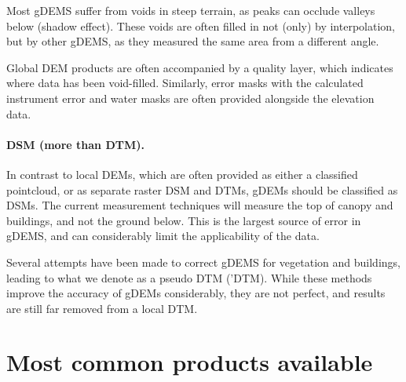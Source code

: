 Most gDEMS suffer from voids in steep terrain, as peaks can occlude valleys below (shadow effect).
These voids are often filled in not (only) by interpolation, but by other gDEMS, as they measured the same area from a different angle.


Global DEM products are often accompanied by a quality layer, which indicates where data has been void-filled.
Similarly, error masks with the calculated instrument error and water masks are often provided alongside the elevation data.





\paragraph{DSM (more than DTM).}
In contrast to local DEMs, which are often provided as either a classified pointcloud, or as separate raster DSM and DTMs, gDEMs should be classified as DSMs.
The current measurement techniques will measure the top of canopy and buildings, and not the ground below.
This is the largest source of error in gDEMS, and can considerably limit the applicability of the data.

Several attempts have been made to correct gDEMS for vegetation and buildings, leading to what we denote as a pseudo DTM ('DTM).
While these methods improve the accuracy of gDEMs considerably, they are not perfect, and results are still far removed from a local DTM\@.

%
\section[Most common products]{Most common products available}


